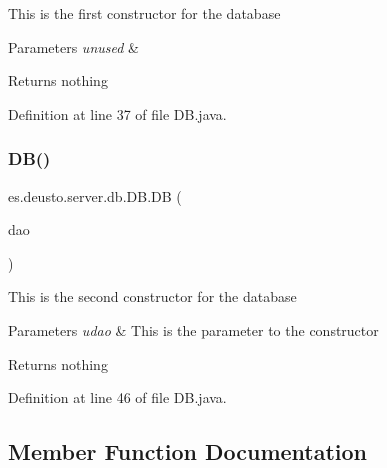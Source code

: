 This is the first constructor for the database 
\begin{DoxyParams}{Parameters}
{\em unused} & \\
\hline
\end{DoxyParams}
\begin{DoxyReturn}{Returns}
nothing 
\end{DoxyReturn}


Definition at line 37 of file D\+B.\+java.

\mbox{\label{classes_1_1deusto_1_1server_1_1db_1_1_d_b_a95f85fb4da6cf8b630f12536c81caaff}} 
\subsubsection{\texorpdfstring{D\+B()}{DB()}\hspace{0.1cm}{\footnotesize\ttfamily [2/2]}}
{\footnotesize\ttfamily es.\+deusto.\+server.\+db.\+D\+B.\+DB (\begin{DoxyParamCaption}\item[{\hyperlink{interfacees_1_1deusto_1_1server_1_1db_1_1dao_1_1_i_d_a_o}{I\+D\+AO}}]{dao }\end{DoxyParamCaption})}

This is the second constructor for the database 
\begin{DoxyParams}{Parameters}
{\em udao} & This is the parameter to the constructor \\
\hline
\end{DoxyParams}
\begin{DoxyReturn}{Returns}
nothing 
\end{DoxyReturn}


Definition at line 46 of file D\+B.\+java.



\subsection{Member Function Documentation}
\mbox{\label{classes_1_1deusto_1_1server_1_1db_1_1_d_b_a376112d91f8e3018821fd9362f6598ae}} 
